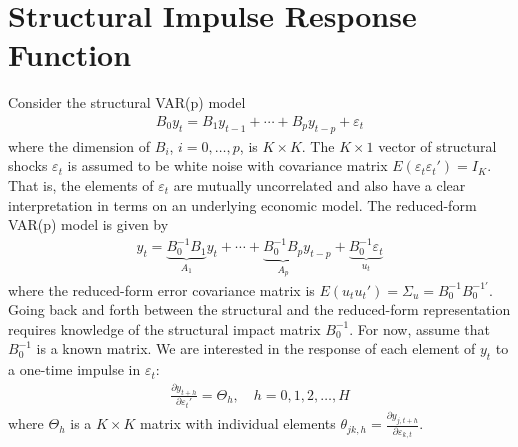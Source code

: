 \section[Structural Impulse Response Function]{Structural Impulse Response Function\label{ex:StructuralImpulseResponseFunction}}
Consider the structural VAR{(p)} model
\begin{align*}
B_0y_t = B_1 y_{t-1} + \cdots  + B_{p} y_{t-p} + \varepsilon_{t}
\end{align*}
where the dimension of \(B_i\), \(i = 0,\ldots ,p\), is \(K \times K\).
The \(K \times 1\) vector of structural shocks \(\varepsilon_{t}\) is assumed to be white noise with covariance matrix \(E(\varepsilon_t \varepsilon_t') = I_K\).
That is, the elements of \(\varepsilon_t\) are mutually uncorrelated and also have a clear interpretation in terms on an underlying economic model.
The reduced-form VAR{(p)} model is given by
\begin{align*}
    y_t = \underbrace{B_0^{-1}B_1}_{A_1}y_t + \cdots  + \underbrace{B_0^{-1}B_p}_{A_p} y_{t-p} + \underbrace{B_0^{-1}\varepsilon_t}_{u_t}
\end{align*}
where the reduced-form error covariance matrix is \(E(u_t u_t')=\Sigma_u = B_0^{-1}B_0^{-1'}\).
Going back and forth between the structural and the reduced-form representation requires knowledge of the structural impact matrix \(B_0^{-1}\).
For now, assume that \(B_0^{-1}\) is a known matrix.
We are interested in the response of each element of \(y_t\) to a one-time impulse in \(\varepsilon_{t}\):
\begin{align*}
    \frac{\partial y_{t+h}}{\partial \varepsilon_{t}'} = \Theta_h, \quad h=0,1,2,\ldots ,H
\end{align*}
where \(\Theta_h\) is a \(K\times K\) matrix with individual elements \(\theta_{jk,h}=\frac{\partial y_{j,t+h}}{\partial \varepsilon_{k,t}}\).


